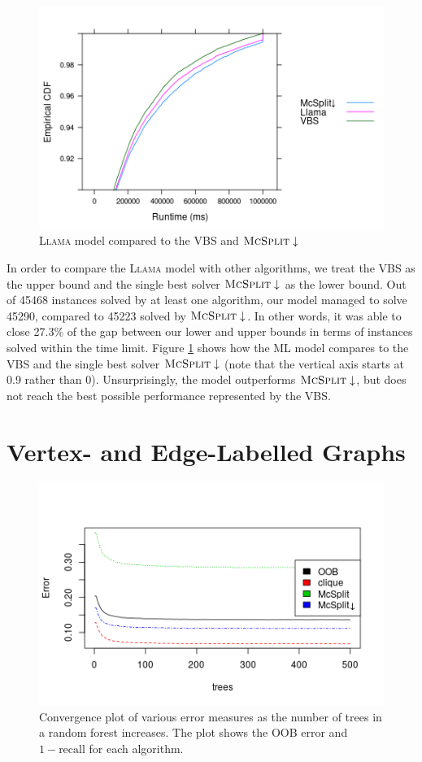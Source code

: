 \documentclass{l4proj}
\theoremstyle{definition}
\theoremstyle{remark}
\begin{document}
\begin{figure}
  \centering
  \includegraphics{images/ecdf_unlabelled_llama.png}
  \caption{\textsc{Llama} model compared to the VBS and
    $\textsc{McSplit}\downarrow$}
  \label{fig:ecdf_unlabelled_llama}
\end{figure}

In order to compare the \textsc{Llama} model with other algorithms, we treat the
VBS as the upper bound and the single best solver $\textsc{McSplit}\downarrow$
as the lower bound. Out of 45468 instances solved by at least one algorithm, our
model managed to solve 45290, compared to 45223 solved by
$\textsc{McSplit}\downarrow$. In other words, it was able to close 27.3\% of the
gap between our lower and upper bounds in terms of instances solved within the
time limit. Figure \ref{fig:ecdf_unlabelled_llama} shows how the ML model
compares to the VBS and the single best solver $\textsc{McSplit}\downarrow$
(note that the vertical axis starts at 0.9 rather than 0). Unsurprisingly, the
model outperforms $\textsc{McSplit}\downarrow$, but does not reach the best
possible performance represented by the VBS.

\section{Vertex- and Edge-Labelled Graphs}

\begin{figure}
  \centering
  \includegraphics[scale=0.7]{images/both_labels_forest_errors.png}
  \caption{Convergence plot of various error measures as the number of trees in
    a random forest increases. The plot shows the OOB error and $1 -
    \text{recall}$ for each algorithm.}
  \label{fig:both_labels_forest_errors}
\end{figure}
\end{document}
